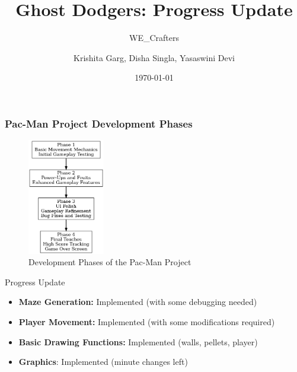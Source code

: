 \documentclass{beamer}
\title{Ghost Dodgers: Progress Update}
\subtitle{WE\_Crafters}
\author{Krishita Garg, Disha Singla, Yasaswini Devi}
\date{\today}
\begin{document}
\begin{frame}
    \titlepage
\end{frame}

\begin{frame}
\frametitle{Pac-Man Project Development Phases}

\begin{figure}
    \centering
    \includegraphics[width=0.3\textwidth]{../Assets/output.png}
    \caption{Development Phases of the Pac-Man Project}
\end{figure}

\end{frame}

\begin{frame}{Progress Update}
    \begin{itemize}
        \item \textbf{Maze Generation:} Implemented (with some debugging needed)
	\item \textbf{Player Movement:} Implemented (with some modifications required)
        \item \textbf{Basic Drawing Functions:} Implemented (walls, pellets, player)
	\item \textbf{Graphics}: Implemented (minute changes left)
    \end{itemize}
\end{frame}
\end{document}
